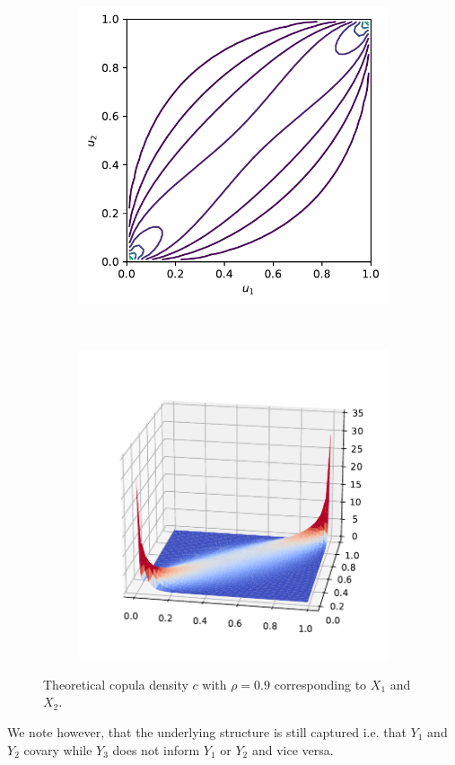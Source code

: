 \documentclass[../Thesis.tex]{subfiles}
\begin{document}
\begin{example}
\begin{figure}[H]
\begin{subfigure}[t]{0.45\linewidth}
            \includegraphics[width = \linewidth]{figures/ND examples/Gaussian copula theoretical contour.pdf}
            \caption{}
        \end{subfigure}%
        ~
        \begin{subfigure}[t]{0.5\linewidth}
            \includegraphics[width = \linewidth]{figures/ND examples/Gaussian copula theoretical pdf.pdf}
            \caption{}
        \end{subfigure}
        \caption{Theoretical copula density $c$ with $\rho = 0.9$ corresponding to $X_1$ and $X_2$.}
        \label{fig:gaussian copula truth}
    \end{figure}
    We note however, that the underlying structure is still captured i.e. that $Y_1$ and $Y_2$ covary while $Y_3$ does not inform $Y_1$ or $Y_2$ and vice versa. 
\end{example}
\end{document}
